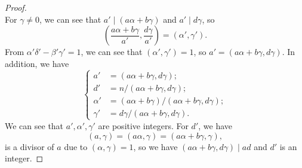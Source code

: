 \documentclass{article}
\newcommand{\Mod}[1]{\ (\mathrm{mod}\ #1)}
\begin{document}
\begin{proof}
\begin{equation*}
    \end{equation*}
    For $\gamma\neq 0$, we can see that $a'\mid (a\alpha+b\gamma)$ and $a' \mid d\gamma$, so \[(\frac{a\alpha+b\gamma}{a'},\frac{d\gamma}{a'})=(\alpha',\gamma').\] From $\alpha'\delta'-\beta'\gamma'=1$, we can see that $(\alpha',\gamma')=1$, so $a'=(a\alpha+b\gamma,d\gamma)$. In addition, we have \begin{equation}\label{eqn 1}
        \begin{cases}
            a'&=(a\alpha+b\gamma,d\gamma);\\
            d'&=n/(a\alpha+b\gamma,d\gamma);\\
            \alpha'&=(a\alpha+b\gamma)/(a\alpha+b\gamma,d\gamma);\\
            \gamma'&=d\gamma/(a\alpha+b\gamma,d\gamma).
        \end{cases}
    \end{equation}
    We can see that $a',\alpha',\gamma'$ are positive integers. For $d'$, we have \[(a,\gamma)=(a\alpha,\gamma)=(a\alpha+b\gamma,\gamma),\]is a divisor of $a$ due to $(\alpha,\gamma)=1$, so we have $(a\alpha+b\gamma,d\gamma)\mid ad$ and $d'$ is an integer. 


\end{proof}
\end{document}
